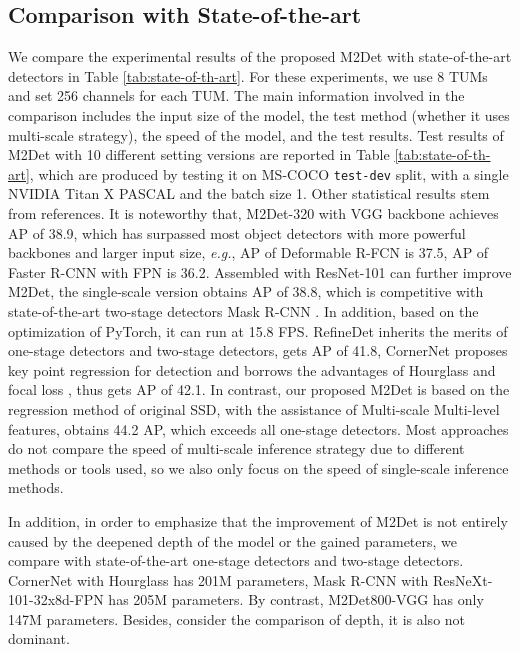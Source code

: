 \documentclass[letterpaper]{article} \usepackage{aaai18}  \usepackage{times}  \usepackage{helvet}  \usepackage{courier}  \usepackage{url}  \usepackage{graphicx}
\begin{document}
\subsection{Comparison with State-of-the-art}
We compare the experimental results of the proposed M2Det with state-of-the-art detectors in Table \ref{tab:state-of-th-art}. For these experiments, we use 8 TUMs and set 256 channels for each TUM. The main information involved in the comparison includes the input size of the model, the test method (whether it uses multi-scale strategy), the speed of the model, and the test results. Test results of M2Det with 10 different setting versions are reported in Table \ref{tab:state-of-th-art}, which are produced by testing it on MS-COCO \texttt{test-dev} split, with a single NVIDIA Titan X PASCAL and the batch size 1. Other statistical results stem from references. It is noteworthy that, M2Det-320 with VGG backbone achieves AP of 38.9, which has surpassed most object detectors with more powerful backbones and larger input size, \textit{e.g.}, AP of Deformable R-FCN \cite{DaiQXLZHW17} is 37.5, AP of Faster R-CNN with FPN is 36.2. Assembled with ResNet-101 can further improve M2Det, the single-scale version obtains AP of 38.8, which is competitive with state-of-the-art two-stage detectors Mask R-CNN \cite{HeGDG17}. In addition, based on the optimization of PyTorch, it can run at 15.8 FPS. RefineDet \cite{abs-1711-06897} inherits the merits of one-stage detectors and two-stage detectors, gets AP of 41.8, CornerNet \cite{abs-1808-01244} proposes key point regression for detection and borrows the advantages of Hourglass \cite{NewellYD16} and focal loss \cite{LinGGHD17}, thus gets AP of 42.1. In contrast, our proposed M2Det is based on the regression method of original SSD, with the assistance of Multi-scale Multi-level features, obtains 44.2 AP, which exceeds all one-stage detectors. Most approaches do not compare the speed of multi-scale inference strategy due to different methods or tools used, so we also only focus on the speed of single-scale inference methods.

In addition, in order to emphasize that the improvement of M2Det is not entirely caused by the deepened depth of the model or the gained parameters, we compare with state-of-the-art one-stage detectors and two-stage detectors. CornerNet with Hourglass has 201M parameters, Mask R-CNN \cite{HeGDG17} with ResNeXt-101-32x8d-FPN \cite{XieGDTH17} has 205M parameters. By contrast, M2Det800-VGG has only 147M parameters. Besides, consider the comparison of depth, it is also not dominant.
\end{document}
